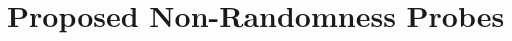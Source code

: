 \documentclass[12pt]{article}
\begin{document}

 

\appendix

\section{Proposed Non-Randomness Probes}\label{app:behave}
\end{document}
